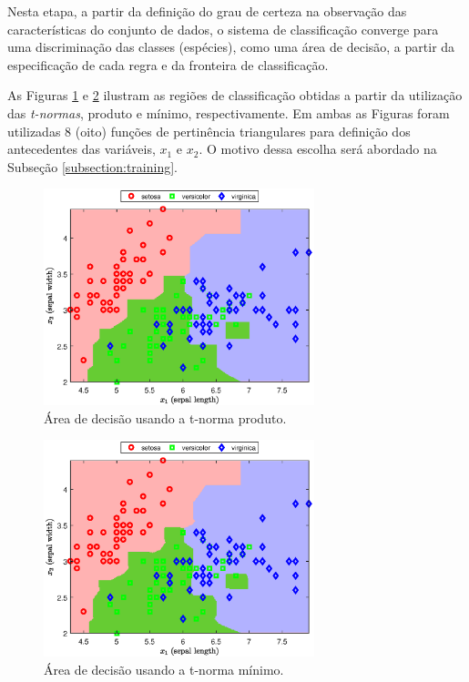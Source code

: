 \documentclass[12pt,a4paper]{article}
\numberwithin{equation}{section}
\begin{document}
Nesta etapa, a partir da definição do grau de certeza na observação das características do conjunto de dados, o sistema de classificação converge para uma discriminação das classes (espécies), como uma área de decisão, a partir da especificação de cada regra e da fronteira de classificação.

As Figuras \ref{fig:product} e \ref{fig:minimum} ilustram as regiões de classificação obtidas a partir da utilização das \textit{t-normas}, produto e mínimo, respectivamente. Em ambas as Figuras foram utilizadas $8$ (oito) funções de pertinência triangulares para definição dos antecedentes das variáveis, $x_1$ e $x_2$. O motivo dessa escolha será abordado na Subseção \ref{subsection:training}.


\begin{figure}[ht!]
\centering
\includegraphics[width=0.7\textwidth]{figures/product.eps}
\caption{Área de decisão usando a t-norma produto.}
\label{fig:product}
\end{figure}


\begin{figure}[ht!]
\centering
\includegraphics[width=0.7\textwidth]{figures/minimum.eps}
\caption{Área de decisão usando a t-norma mínimo.}
\label{fig:minimum}
\end{figure}
\end{document}
